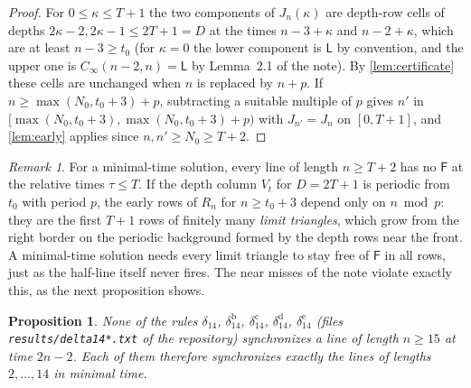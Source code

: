 \documentclass[11pt]{article}
\newtheorem{proposition}[theorem]{Proposition}
\theoremstyle{definition}
\theoremstyle{remark}
\newtheorem{remark}[theorem]{Remark}
\newcommand{\Lq}{\mathsf L}
\newcommand{\Fq}{\mathsf F}
\begin{document}
\begin{proof}
For $0\le\kappa\le T+1$ the two components of $J_n(\kappa)$ are depth-row cells
of depths $2\kappa-2,2\kappa-1\le 2T+1=D$ at the times $n-3+\kappa$ and
$n-2+\kappa$, which are at least $n-3\ge t_0$ (for $\kappa=0$ the lower
component is $\Lq$ by convention, and the upper one is $C_\infty(n-2,n)=\Lq$ by
Lemma~2.1 of the note). By \cref{lem:certificate} these cells are unchanged when
$n$ is replaced by $n+p$. If $n\ge\max(N_0,t_0+3)+p$, subtracting a suitable
multiple of $p$ gives $n'$ in $[\max(N_0,t_0+3),\max(N_0,t_0+3)+p)$ with
$J_{n'}=J_n$ on $[0,T+1]$, and \cref{lem:early} applies since $n,n'\ge N_0\ge
T+2$.
\end{proof}

\begin{remark}\label{rem:limit}
For a minimal-time solution, every line of length $n\ge T+2$ has no $\Fq$ at
the relative times $\tau\le T$. If the depth column $V_t$ for $D=2T+1$ is
periodic from $t_0$ with period $p$, the early rows of $R_n$ for $n\ge t_0+3$
depend only on $n\bmod p$: they are the first $T+1$ rows of finitely many
\emph{limit triangles}, which grow from the right border on the periodic
background formed by the depth rows near the front. A minimal-time solution
needs every limit triangle to stay free of $\Fq$ in all rows, just as the
half-line itself never fires. The near misses of the note violate exactly this,
as the next proposition shows.
\end{remark}

\begin{proposition}\label{prop:nearmiss}
None of the rules $\delta_{14}$, $\delta_{14}^{\mathrm b}$,
$\delta_{14}^{\mathrm c}$, $\delta_{14}^{\mathrm d}$, $\delta_{14}^{\mathrm e}$
(files \texttt{results/delta14*.txt} of the repository) synchronizes a line of
length $n\ge15$ at time $2n-2$. Each of them therefore synchronizes exactly the
lines of lengths $2,\dots,14$ in minimal time.
\end{proposition}
\end{document}
